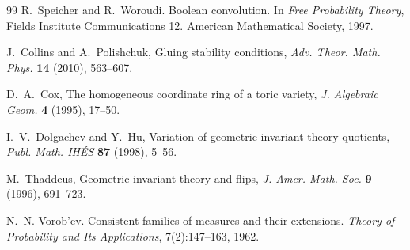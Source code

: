 \documentclass[11pt]{article}
\theoremstyle{definition}
\theoremstyle{remark}
\begin{document}
\begin{thebibliography}{99}
R.~Speicher and R.~Woroudi.
\newblock Boolean convolution.
\newblock In \emph{Free Probability Theory}, Fields Institute Communications 12. American Mathematical
Society, 1997.

J.~Collins and A.~Polishchuk, Gluing stability conditions, \emph{Adv. Theor. Math. Phys.} \textbf{14} (2010), 563--607.

D.~A.~Cox, The homogeneous coordinate ring of a toric variety, \emph{J. Algebraic Geom.} \textbf{4} (1995), 17--50.

I.~V.~Dolgachev and Y.~Hu, Variation of geometric invariant theory quotients, \emph{Publ. Math. IH\'ES} \textbf{87} (1998), 5--56.

M.~Thaddeus, Geometric invariant theory and flips, \emph{J. Amer. Math. Soc.} \textbf{9} (1996), 691--723.

N.~N. Vorob'ev.
\newblock Consistent families of measures and their extensions.
\newblock \emph{Theory of Probability and Its Applications}, 7(2):147--163, 1962.

\end{thebibliography}
\end{document}
